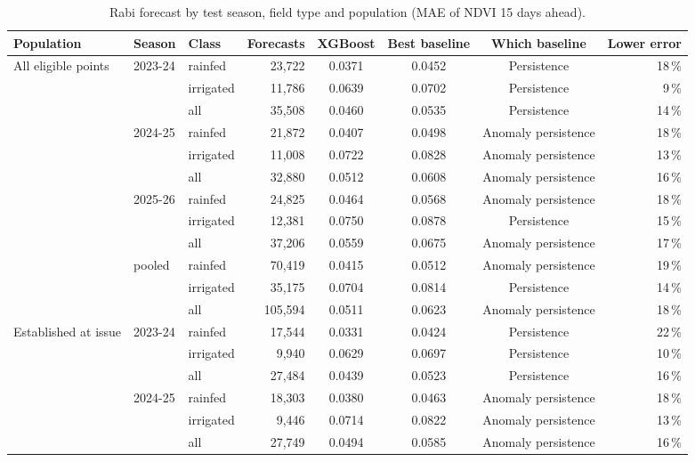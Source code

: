 \documentclass[11pt,a4paper,oneside]{article}
\begin{document}
\begin{table}[H]
\centering
\caption{Rabi forecast by test season, field type and population (MAE of NDVI 15 days ahead).}
\label{tab:r_breakdown}
\scriptsize
\begin{tabular}{@{}lllrcccr@{}}
\toprule
\textbf{Population} & \textbf{Season} & \textbf{Class} & \textbf{Forecasts} & \textbf{XGBoost} & \textbf{Best baseline} & \textbf{Which baseline} & \textbf{Lower error} \\
\midrule
All eligible points & 2023-24 & rainfed & 23,722 & 0.0371 & 0.0452 & Persistence & 18\,\% \\
 &  & irrigated & 11,786 & 0.0639 & 0.0702 & Persistence & 9\,\% \\
 &  & all & 35,508 & 0.0460 & 0.0535 & Persistence & 14\,\% \\
 & 2024-25 & rainfed & 21,872 & 0.0407 & 0.0498 & Anomaly persistence & 18\,\% \\
 &  & irrigated & 11,008 & 0.0722 & 0.0828 & Anomaly persistence & 13\,\% \\
 &  & all & 32,880 & 0.0512 & 0.0608 & Anomaly persistence & 16\,\% \\
 & 2025-26 & rainfed & 24,825 & 0.0464 & 0.0568 & Anomaly persistence & 18\,\% \\
 &  & irrigated & 12,381 & 0.0750 & 0.0878 & Persistence & 15\,\% \\
 &  & all & 37,206 & 0.0559 & 0.0675 & Anomaly persistence & 17\,\% \\
 & pooled & rainfed & 70,419 & 0.0415 & 0.0512 & Anomaly persistence & 19\,\% \\
 &  & irrigated & 35,175 & 0.0704 & 0.0814 & Persistence & 14\,\% \\
 &  & all & 105,594 & 0.0511 & 0.0623 & Anomaly persistence & 18\,\% \\
\midrule
Established at issue & 2023-24 & rainfed & 17,544 & 0.0331 & 0.0424 & Persistence & 22\,\% \\
 &  & irrigated & 9,940 & 0.0629 & 0.0697 & Persistence & 10\,\% \\
 &  & all & 27,484 & 0.0439 & 0.0523 & Persistence & 16\,\% \\
 & 2024-25 & rainfed & 18,303 & 0.0380 & 0.0463 & Anomaly persistence & 18\,\% \\
 &  & irrigated & 9,446 & 0.0714 & 0.0822 & Anomaly persistence & 13\,\% \\
 &  & all & 27,749 & 0.0494 & 0.0585 & Anomaly persistence & 16\,\% \\

\end{tabular}
\end{table}
\end{document}
